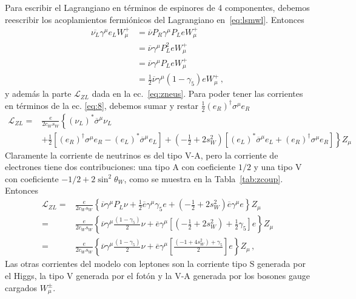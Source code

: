 \begin{frame}
Para escribir el Lagrangiano en términos de espinores de 4 componentes, debemos reescribir los acoplamientos
fermiónicos del Lagrangiano en~\eqref{eq:lsmwl}. Entonces
\begin{align}
\label{eq:wf4}
  \overline{\nu_L}\gamma^\mu e_LW_\mu^+&=\overline{\nu}P_R\gamma^\mu P_LeW_\mu^+\nonumber\\
&=\overline{\nu}\gamma^\mu P_L^2eW_\mu^+\nonumber\\
&=\overline{\nu}\gamma^\mu P_LeW_\mu^+\nonumber\\
&=\frac{1}{2}\overline{\nu}\gamma^\mu(1-\gamma_5)eW_\mu^+\,,
\end{align}
y además la parte $\mathcal{L}_{ZL}$ dada en la ec.~\eqref{eq:zneus}. Para poder tener las corrientes en términos de la ec. \eqref{eq:8}, debemos sumar y restar
$\frac{1}{2}\left( e_R \right)^{\dagger}{\sigma}^\mu e_R $ 
\begin{align}
  \mathcal{L}_{ZL}
  =&\frac{e}{2c_W s_W} \left\{ \left( \nu_L \right)^{*}\overline{\sigma}^\mu \nu_L
     \phantom{\frac{1}{}2}\right. \nonumber\\
& \left. 
  +\frac{1}{2}\left[\left( e_R \right)^{\dagger}{\sigma}^\mu e_R-\left( e_L \right)^{*}\overline{\sigma}^\mu e_L
      \right]
      + \left( -\frac{1}{2} +2s_W^2 \right) \left[\left( e_L \right)^{*}\overline{\sigma}^\mu e_L+
    \left( e_R \right)^{\dagger}{\sigma}^\mu e_R    \right]  
     \right\}Z_\mu 
\end{align}
Claramente la corriente de neutrinos es del tipo $\text{V-A}$, pero la corriente
de electrones tiene dos contribuciones: una tipo $\text{A}$ con coeficiente $1/2$
y una tipo $\text{V}$ con coeficiente $-1/2+2\sin^2\theta_W$, como se muestra en la Tabla~\ref{tab:zcoup}.
Entonces
\begin{align}
    \mathcal{L}_{ZL}
  =&\frac{e}{2c_W s_W} \left\{ \overline{\nu}\gamma^{\mu}P_L\nu
       +\frac{1}{2} \overline{e} \gamma^{\mu} \gamma_5 e
      + \left( -\frac{1}{2} +2s_W^2 \right) \overline{e} \gamma^{\mu} e  
     \right\}Z_\mu \nonumber\\
  =&\frac{e}{2c_W s_W} \left\{
     \overline{\nu}\gamma^{\mu}\frac{\left( 1 -\gamma_5 \right)}{2}\nu
+ \overline{e} \gamma^{\mu} \left[ \left(- \frac{1}{2}+ 2s_W^2 \right) +\frac{1}{2}\gamma_5\right] e
     \right\}Z_\mu \nonumber\\
 =&\frac{e}{2c_W s_W} \left\{
     \overline{\nu}\gamma^{\mu}\frac{\left( 1 -\gamma_5 \right)}{2}\nu
+ \overline{e} \gamma^{\mu} \left[ \frac{\left( -1+4s_W^2 \right)+\gamma_5}{2}\right] e
     \right\}Z_\mu  \,,
\end{align}
Las otras corrientes del modelo con leptones son la corriente tipo $\text{S}$ generada por el Higgs, la tipo $\text{V}$ generada por el fotón
y la  $\text{V-A}$ generada por los bosones gauge cargados $W_{\mu}^{\pm}$.
\end{frame}
